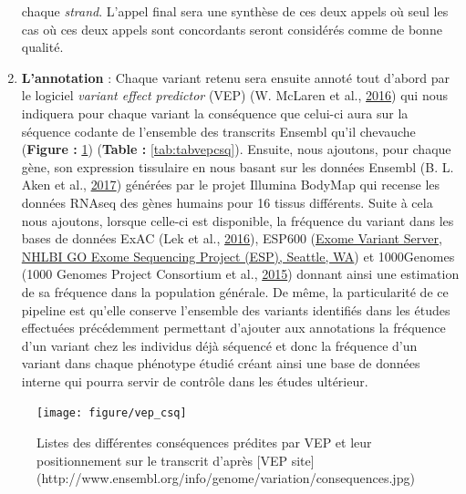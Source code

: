 \documentclass[12pt,twoside]{reedthesis}
\theoremstyle{definition}
\theoremstyle{definition}
\theoremstyle{remark}
\begin{document}
\begin{enumerate}
    chaque \emph{strand}. L'appel final sera une synthèse de ces deux
    appels où seul les cas où ces deux appels sont concordants seront
    considérés comme de bonne qualité.\\
  \item
    \textbf{L'annotation} : Chaque variant retenu sera ensuite annoté tout
    d'abord par le logiciel \emph{variant effect predictor} (VEP) (W.
    McLaren et al., \protect\hyperlink{ref-McLaren2016}{2016}) qui nous
    indiquera pour chaque variant la conséquence que celui-ci aura sur la
    séquence codante de l'ensemble des transcrits Ensembl qu'il chevauche
    (\textbf{Figure : }\ref{fig:figvepcsq}) (\textbf{Table :
    }\ref{tab:tabvepcsq}). Ensuite, nous ajoutons, pour chaque gène, son
    expression tissulaire en nous basant sur les données Ensembl (B. L.
    Aken et al., \protect\hyperlink{ref-Aken2017}{2017}) générées par le
    projet Illumina BodyMap qui recense les données RNAseq des gènes
    humains pour 16 tissus différents. Suite à cela nous ajoutons, lorsque
    celle-ci est disponible, la fréquence du variant dans les bases de
    données ExAC (Lek et al., \protect\hyperlink{ref-Lek2016}{2016}),
    ESP600 (\href{http://evs.gs.washington.edu/EVS/}{Exome Variant Server,
    NHLBI GO Exome Sequencing Project (ESP), Seattle, WA}) et 1000Genomes
    (1000 Genomes Project Consortium et al.,
    \protect\hyperlink{ref-1000GenomesProjectConsortium2015}{2015})
    donnant ainsi une estimation de sa fréquence dans la population
    générale. De même, la particularité de ce pipeline est qu'elle
    conserve l'ensemble des variants identifiés dans les études effectuées
    précédemment permettant d'ajouter aux annotations la fréquence d'un
    variant chez les individus déjà séquencé et donc la fréquence d'un
    variant dans chaque phénotype étudié créant ainsi une base de données
    interne qui pourra servir de contrôle dans les études ultérieur.
  \end{enumerate}
  
  \begin{figure}
  
  {\centering \texttt{[image: figure/vep\_csq]} 
  
  }
  
  \caption[Listes des différentes conséquences prédites par VEP et leur positionnement sur le transcrit]{Listes des différentes conséquences prédites par VEP et leur positionnement sur le transcrit d'après [VEP site](http://www.ensembl.org/info/genome/variation/consequences.jpg)}\label{fig:figvepcsq}
  \end{figure}
  
\end{document}
